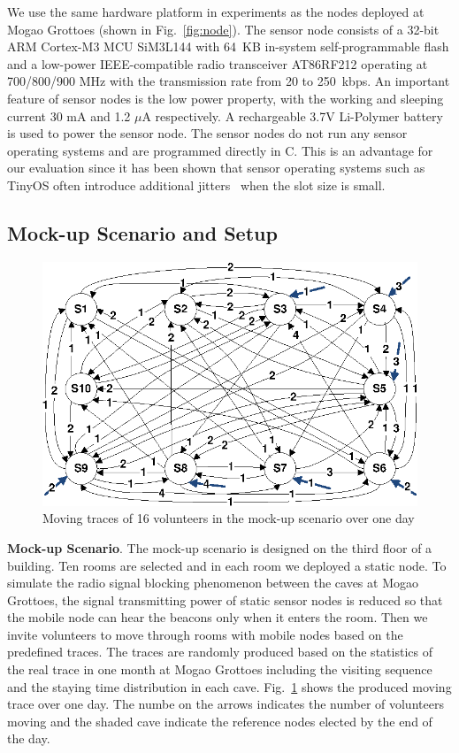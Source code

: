 \documentclass[twoside,twocolumn]{article}
\begin{document}
We use the same hardware platform in experiments as the nodes deployed
at Mogao Grottoes (shown in Fig.~\ref{fig:node}). The sensor node 
consists of a 32-bit ARM Cortex-M3 MCU SiM3L144 with 64~KB in-system
self-programmable flash and a low-power IEEE-compatible radio transceiver 
AT86RF212 operating at 700/800/900 MHz with the transmission rate from 
20 to 250~kbps. An important feature of sensor nodes is the low power 
property, with the working and sleeping current 30 mA and 1.2 $\mu$A 
respectively. A rechargeable 3.7V Li-Polymer battery is used to power 
the sensor node. The sensor nodes do not run any sensor operating systems
and are programmed directly in C. This is an advantage for our evaluation 
since it has been shown that sensor operating systems such as TinyOS often
introduce additional jitters~\citep{zhang2012acc} when the slot size is small.

\subsection{Mock-up Scenario and Setup}
\begin{figure}[t]
   \centering
   \includegraphics[width=.9\columnwidth]{static/route-1}
   \caption{Moving traces of 16 volunteers in the mock-up scenario over one day}
   \label{fig:mockup}
\end{figure}

{\bf Mock-up Scenario}. The mock-up scenario is designed on the third floor of a
building. Ten rooms are selected and in each room we deployed a static node. To 
simulate the radio signal blocking phenomenon between the caves at Mogao Grottoes, 
the signal transmitting power of static sensor nodes is reduced so that the mobile 
node can hear the beacons only when it enters the room. Then we invite volunteers 
to move through rooms with mobile nodes based on the predefined traces. The traces 
are randomly produced based on the statistics of the real trace in one month at 
Mogao Grottoes including the visiting sequence and the staying time distribution in 
each cave. Fig.~\ref{fig:mockup} shows the produced moving trace over one day. The 
numbe on the arrows indicates the number of volunteers moving and the shaded cave 
indicate the reference nodes elected by the end of the day.
\end{document}
